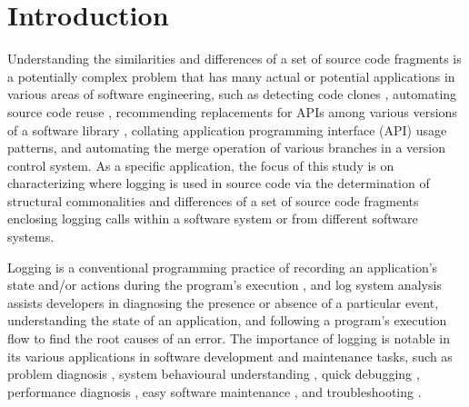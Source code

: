 \chapter{Introduction}  \label{Introduction}


Understanding the similarities and differences of a set of source code fragments is a potentially complex problem that has many actual or potential applications in various areas of software engineering, such as detecting code clones \cite{bulychev2009evaluation}, automating source code reuse \cite{2008:fse:cottrell}, recommending replacements for APIs among various versions of a software library \cite{2014:uofc:cossette}, collating application programming interface (API) usage patterns, and automating the merge operation of various branches in a version control system. As a specific application, the focus of this study is on characterizing where logging is used in source code via the determination of structural commonalities and differences of a set of source code fragments enclosing logging calls within a software system or from different software systems.

Logging is a conventional programming practice of recording an application's state and/or actions during the program's execution \cite{gupta2005pro}, and log system analysis assists developers in diagnosing the presence or absence of a particular event, understanding the state of an application, and following a program's execution flow to find the root causes of an error. The importance of logging is notable in its various applications in software development and maintenance tasks, such as problem diagnosis \cite{lou2010mining}, system behavioural understanding \cite{fu2013contextual}, quick debugging \cite{gupta2005pro}, performance diagnosis \cite{nagaraj2012structured}, easy software maintenance \cite{gupta2005pro}, and troubleshooting \cite{fu2009execution}.

